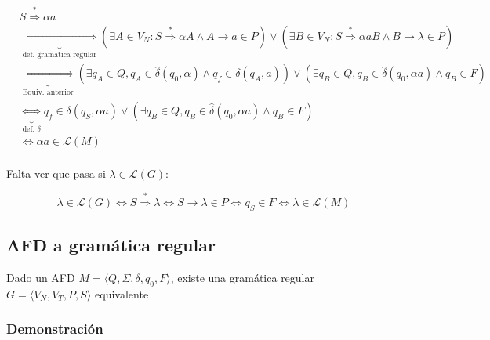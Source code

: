 \begin{align*}
   & S\overset{*}{\Rightarrow} \alpha a                                                                                                                                                                                                    \\
   & \underbrace{\iff}_{\text{def. gramatica regular}} (\exists A\in V_N: S \overset{*}{\Rightarrow} \alpha A \wedge A \rightarrow a \in P)\lor(\exists B\in V_N: S \overset{*}{\Rightarrow} \alpha aB \wedge B \rightarrow \lambda \in P) \\
   & \underbrace{\iff}_{\text{Equiv. anterior}} (\exists q_A\in Q, q_A\in\hat\delta(q_0, \alpha) \land q_f\in\delta(q_A, a)) \lor (\exists q_B\in Q, q_B\in\hat\delta(q_0, \alpha a) \land q_B\in F)                                       \\
   & \underbrace{\iff}_{\text{def. }\delta} q_f\in\delta(q_S, \alpha a) \lor (\exists q_B\in Q, q_B\in\hat\delta(q_0, \alpha a) \land q_B\in F)                                                                                            \\
   & \iff \alpha a \in \mathcal{L}(M)                                                                                                                                                                                                      \\
\end{align*}

Falta ver que pasa si \(\lambda\in\mathcal{L}(G)\):

\[ \lambda\in\mathcal{L}(G) \iff S\overset{*}{\Rightarrow} \lambda \iff S\rightarrow \lambda \in P \iff q_S\in F \iff \lambda \in \mathcal{L}(M)\]


\subsection{AFD a gramática regular}
Dado un AFD \(M=\langle Q, \Sigma, \delta, q_0, F\rangle\), existe una gramática regular \(G=\langle V_N, V_T, P, S\rangle\) equivalente

\subsubsection{Demonstración}
